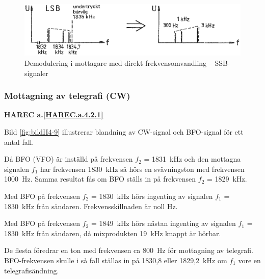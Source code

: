\begin{figure}
  \includegraphics[width=\textwidth]{images/cropped_pdfs/bild_2_4-10.pdf}
  \caption{Demodulering i mottagare med direkt frekvensomvandling -- SSB-signaler}
  \label{fig:bildII4-10}
\end{figure}

\subsubsection{Mottagning av telegrafi (CW)}
\textbf{HAREC a.\ref{HAREC.a.4.2.1}\label{myHAREC.a.4.2.1}}

Bild \ref{fig:bildII4-9} illustrerar blandning av CW-signal och BFO-signal
för ett antal fall.

Då BFO (VFO) är inställd på frekvensen \(f_2\) = 1831~kHz och den
mottagna signalen \(f_1\) har frekvensen 1830~kHz så hörs en
svävningston med frekvensen 1000~Hz.
Samma resultat fås om BFO ställs in på frekvensen \(f_2\) = 1829~kHz.

Med BFO på frekvensen \(f_2\) = 1830~kHz hörs ingenting av signalen
\(f_1\) = 1830~kHz från sändaren.
Frekvensskillnaden är noll Hz.

Med BFO på frekvensen \(f_2\) = 1849~kHz hörs nästan ingenting av signalen
\(f_1\) = 1830~kHz från sändaren, då mixprodukten 19~kHz knappt är hörbar.

De flesta föredrar en ton med frekvensen ca 800~Hz för mottagning av telegrafi.
BFO-frekvensen skulle i så fall ställas in på 1830,8 eller
1829,2~kHz om \(f_1\) vore en telegrafisändning.

